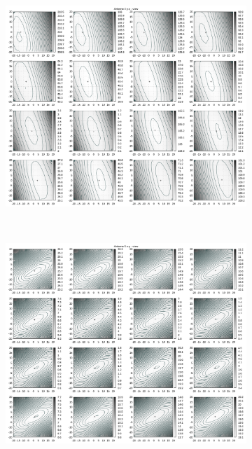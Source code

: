 \begin{appendix}
\begin{figure}[!ht]
\begin{subfigure}[t]{0.3\textwidth}
	\end{subfigure}
	\begin{subfigure}[t]{0.3\textwidth}
			\centering
	   \includegraphics[width=\textwidth]{img/fitness/yz/a4.png}
	\end{subfigure}
\\
	\centering
	\begin{subfigure}[t]{0.3\textwidth}
	     \centering
	     \includegraphics[width=\textwidth]{img/fitness/xy/a5.png}

\end{subfigure}
\end{figure}
\end{appendix}
